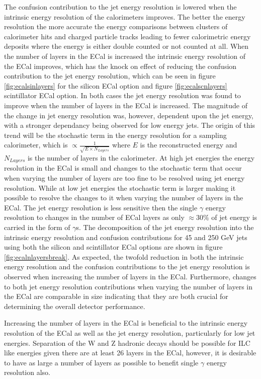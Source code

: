 The confusion contribution to the jet energy resolution is lowered when the intrinsic energy resolution of the calorimeters improves.  The better the energy resolution the more accurate the energy comparisons between clusters of calorimeter hits and charged particle tracks leading to fewer calorimetric energy deposits where the energy is either double counted or not counted at all.  When the number of layers in the ECal is increased the intrinsic energy resolution of the ECal improves, which has the knock on effect of reducing the confusion contribution to the jet energy resolution, which can be seen in figure \ref{fig:ecalsinlayers} for the silicon ECal option and figure \ref{fig:ecalscnlayers} scintillator ECal option.  In both cases the jet energy resolution was found to improve when the number of layers in the ECal is increased.  The magnitude of the change in jet energy resolution was, however, dependent upon the jet energy, with a stronger dependancy being observed for low energy jets.  The origin of this trend will be the stochastic term in the energy resolution for a sampling calorimeter, which is $\propto \frac{1}{\sqrt{E \times N_{Layers}}}$ where $E$ is the reconstructed energy and $N_{Layers}$ is the number of layers in the calorimeter.  At high jet energies the energy resolution in the ECal is small and changes to the stochastic term that occur when varying the number of layers are too fine to be resolved using jet energy resolution.  While at low jet energies the stochastic term is larger making it possible to resolve the changes to it when varying the number of layers in the ECal.  The jet energy resolution is less sensitive then the single $\gamma$ energy resolution to changes in the number of ECal layers as only $\approx 30\%$ of jet energy is carried in the form of $\gamma$s.  The decomposition of the jet energy resolution into the intrinsic energy resolution and confusion contributions for 45 and 250 GeV jets using both the silicon and scintillator ECal options are shown in figure \ref{fig:ecalnlayersbreak}.  As expected, the twofold reduction in both the intrinsic energy resolution and the confusion contributions to the jet energy resolution is observed when increasing the number of layers in the ECal.  Furthermore, changes to both jet energy resolution contributions when varying the number of layers in the ECal are comparable in size indicating that they are both crucial for determining the overall detector performance.  

Increasing the number of layers in the ECal is beneficial to the intrinsic energy resolution of the ECal as well as the jet energy resolution, particularly for low jet energies.  Separation of the W and Z hadronic decays should be possible for ILC like energies given there are at least 26 layers in the ECal, however, it is desirable to have as large a number of layers as possible to benefit single $\gamma$ energy resolution also.  


